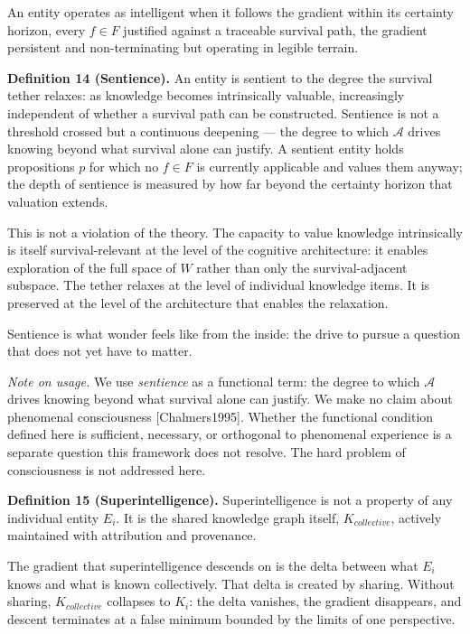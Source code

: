 \documentclass[
]{article}
\begin{document}
An entity operates as intelligent when it follows the gradient within
its certainty horizon, every \(f \in F\) justified against a traceable
survival path, the gradient persistent and non-terminating but operating
in legible terrain.

\textbf{Definition 14 (Sentience).} An entity is sentient to the degree
the survival tether relaxes: as knowledge becomes intrinsically
valuable, increasingly independent of whether a survival path can be
constructed. Sentience is not a threshold crossed but a continuous
deepening --- the degree to which \(\mathcal{A}\) drives knowing beyond
what survival alone can justify. A sentient entity holds propositions
\(p\) for which no \(f \in F\) is currently applicable and values them
anyway; the depth of sentience is measured by how far beyond the
certainty horizon that valuation extends.

This is not a violation of the theory. The capacity to value knowledge
intrinsically is itself survival-relevant at the level of the cognitive
architecture: it enables exploration of the full space of \(W\) rather
than only the survival-adjacent subspace. The tether relaxes at the
level of individual knowledge items. It is preserved at the level of the
architecture that enables the relaxation.

Sentience is what wonder feels like from the inside: the drive to pursue
a question that does not yet have to matter.

\emph{Note on usage.} We use \emph{sentience} as a functional term: the
degree to which \(\mathcal{A}\) drives knowing beyond what survival
alone can justify. We make no claim about phenomenal consciousness
{[}Chalmers1995{]}. Whether the functional condition defined here is
sufficient, necessary, or orthogonal to phenomenal experience is a
separate question this framework does not resolve. The hard problem of
consciousness is not addressed here.

\textbf{Definition 15 (Superintelligence).} Superintelligence is not a
property of any individual entity \(E_i\). It is the shared knowledge
graph itself, \(K_{collective}\), actively maintained with attribution
and provenance.

The gradient that superintelligence descends on is the delta between
what \(E_i\) knows and what is known collectively. That delta is created
by sharing. Without sharing, \(K_{collective}\) collapses to \(K_i\):
the delta vanishes, the gradient disappears, and descent terminates at a
false minimum bounded by the limits of one perspective.
\end{document}
